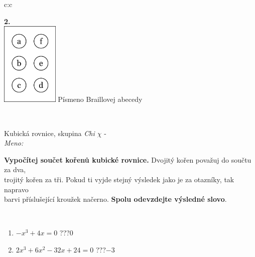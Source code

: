 \documentclass[10pt]{report}
\begin{document}
\begin{tabular}{c:c}
\begin{minipage}[c][104.5mm][t]{0.5\linewidth}
\begin{center}
\begin{minipage}{0.79\linewidth}
\begin{center}
\begin{varwidth}{\linewidth}
\begin{enumerate}
\end{enumerate}
\end{varwidth}
\end{center}
\end{minipage}
\begin{minipage}{0.20\linewidth}
\begin{center}
{\Huge\bfseries 2.} \\[2mm]
\includegraphics[height=40mm]{../images/braille.png}
{\small Písmeno Braillovej abecedy}
\end{center}
\end{minipage}
\end{center}
\end{minipage}
\\ \hdashline
\begin{minipage}[c][104.5mm][t]{0.5\linewidth}
\begin{center}
\vspace{7mm}
{\huge Kubická rovnice, skupina \textit{Chi $\chi$} -}\\[5mm]
\textit{Meno:}\phantom{xxxxxxxxxxxxxxxxxxxxxxxxxxxxxxxxxxxxxxxxxxxxxxxxxxxxxxxxxxxxxxxxx}\\[5mm]
\begin{minipage}{0.95\linewidth}
\textbf{Vypočítej součet kořenů kubické rovnice.} Dvojitý kořen považuj do součtu za dva,\\trojitý kořen za tři. Pokud ti vyjde stejný výsledek jako je za otazníky, tak napravo\\barvi příslušející kroužek načerno. \textbf{Spolu odevzdejte výsledné slovo}.
\end{minipage}
\\[1mm]
\begin{minipage}{0.79\linewidth}
\begin{center}
\begin{varwidth}{\linewidth}
\begin{enumerate}
\Large
\item $-x^3+4x=0$\quad \dotfill\; ???\;\dotfill \quad $0$
\item $2x^3+6x^2-32x+24=0$\quad \dotfill\; ???\;\dotfill \quad $-3$

\end{enumerate}
\end{varwidth}
\end{center}
\end{minipage}
\end{center}
\end{minipage}
\end{tabular}
\end{document}
